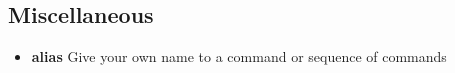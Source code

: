 \subsection{Miscellaneous}

\begin{itemize}
	\item \textbf{alias} Give your own name to a command or sequence of commands
\end{itemize}

\pagebreak

